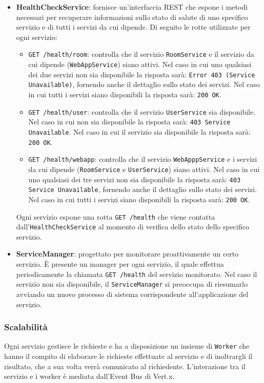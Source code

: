 \documentclass[a4paper]{article}
\begin{document}
\begin{itemize}
    \item \textbf{HealthCheckService}: fornisce un'interfaccia REST che espone i metodi necessari per recuperare informazioni sullo stato di salute di uno specifico servizio e di tutti i servizi da cui dipende.
    Di seguito le rotte utilizzate per ogni servizio:
    \begin{itemize}
        \item \texttt{GET /health/room}: controlla che il servizio \texttt{RoomService} e il servizio da cui dipende (\texttt{WebAppService}) siano attivi. Nel caso in cui uno qualsiasi dei due servizi non sia disponibile la risposta sarà: \texttt{Error 403 (Service Unavailable)}, fornendo anche il dettaglio sullo stato dei servizi. Nel caso in cui tutti i servizi siano disponibili la risposta sarà: \texttt{200 OK}.
        \item \texttt{GET /health/user}: controlla che il servizio \texttt{UserService} sia disponibile. Nel caso in cui non sia disponibile la risposta sarà: \texttt{403 Service Unavailable}. Nel caso in cui il servizio sia disponibile la risposta sarà: \texttt{200 OK}.
        \item \texttt{GET /health/webapp}: controlla che il servizio \texttt{WebApppService} e i servizi da cui dipende (\texttt{RoomService} e \texttt{UserService}) siano attivi. Nel caso in cui uno qualsiasi dei tre servizi non sia disponibile la risposta sarà: \texttt{403 Service Unavailable}, fornendo anche il dettaglio sullo stato dei servizi. Nel caso in cui tutti i servizi siano disponibili la risposta sarà: \texttt{200 OK}.
    \end{itemize}
    Ogni servizio espone una rotta \texttt{GET /health} che viene contatta dall'\texttt{HealthCheckService} al momento di verifica dello stato dello specifico servizio.
        
    \item \textbf{ServiceManager}: progettato per monitorare proattivamente un certo servizio.
    È presente un manager per ogni servizio, il quale effettua periodicamente la chiamata \texttt{GET /health} del servizio monitorato. Nel caso il servizio non sia disponibile, il \texttt{ServiceManager} si preoccupa di riesumarlo avviando un nuovo processo di sistema corrispondente all'applicazione del servizio.

\end{itemize}

\subsubsection{Scalabilità}
Ogni servizio gestisce le richieste e ha a disposizione un insieme di \texttt{Worker} che hanno il compito di elaborare le richieste effettuate al servizio e di inoltrargli il risultato, che a sua volta verrà comunicato al richiedente. L'interazione tra il servizio e i worker è mediata dall'Event Bus di Vert.x.
\end{document}
